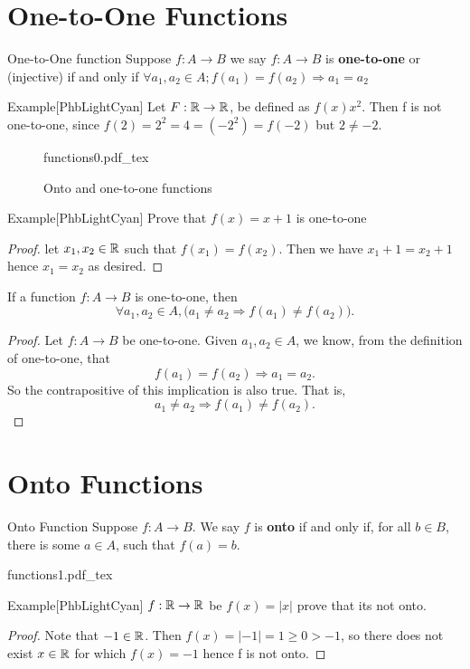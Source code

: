 \documentclass[../MATH-2000-Notes.tex]{subfiles}
\begin{document}
\section{One-to-One Functions}
\begin{Definition}
    {One-to-One function}
    Suppose \(f:A\rightarrow B\) we say \(f:A\rightarrow B\) is \textbf{one-to-one} or (injective) if and only if \(\forall a_1,a_2\in A; f(a_1) = f(a_2) \Rightarrow a_1 = a_2\)
\end{Definition}
\begin{commentbox}{Example}[{PhbLightCyan}]
    Let \(F: \mathbb{R} \rightarrow \mathbb{R}\), be defined as \(f(x) x^2\). Then f is not one-to-one, since \(f(2) = 2^2 = 4 = (-2^2) = f(-2)\) but \(2 \neq -2\).
\end{commentbox}
\begin{figure}[htbp]
    \centering
    {functions0.pdf_tex}
    \caption{Onto and one-to-one functions}
    \label{fig:onto-1to1}
\end{figure}
\begin{commentbox}{Example}[{PhbLightCyan}]
    Prove that \(f(x) = x + 1\) is one-to-one
\end{commentbox}
\begin{proof}
    let \(x_1,x_2 \in \mathbb{R}\) such that \(f(x_1) = f(x_2)\). Then we have \(x_1 + 1 = x_2 + 1\) hence \(x_1 = x_2\) as desired.
\end{proof}
\begin{Theorem}
    {}\label{alternate11thm}
    If a function $f\colon A \to B$ is one-to-one, then $$\forall a_1, a_2 \in A, \bigl( a_1 \neq a_2 \Rightarrow f(a_1) \neq f(a_2)\bigr).$$
\end{Theorem}
\begin{proof}
    Let $f \colon A \to B$ be one-to-one. Given $a_1,a_2 \in A$, we know, from the definition of one-to-one,  that
    $$  f(a_1) = f(a_2) \Rightarrow a_1 = a_2 .$$
    So the contrapositive of this implication is also true. That is,
    \[
        a_1 \neq a_2 \Rightarrow f(a_1) \neq f(a_2) .
    \]
\end{proof}

\section{Onto Functions}
\begin{Definition}
    {Onto Function}
    Suppose $f \colon A \to B$. We say $f$ is \textbf{onto} if and only if, for all $b \in B$, there is some $a \in A$, such that $f(a) = b$.
\end{Definition}
{functions1.pdf_tex}
\begin{commentbox}{Example}[{PhbLightCyan}]
    \(f:\mathbb{R}\rightarrow \mathbb{R}\) be \(f(x) =  |x|\) prove that its not onto.
\end{commentbox}
\begin{proof}
    Note that \(-1 \in \mathbb{R}\). Then \(f(x) = |-1| = 1 \geq 0 > -1\), so there does not exist \(x \in \mathbb{R}\) for which \(f(x) = -1\) hence f is not onto.
\end{proof}
\end{document}
